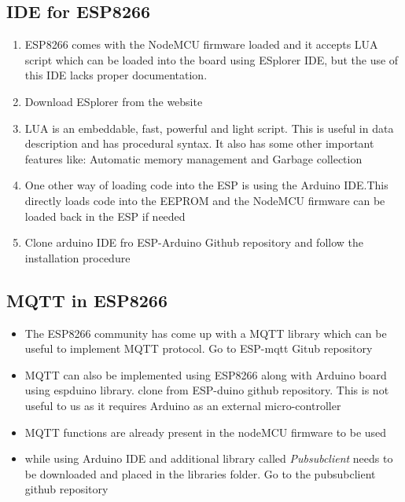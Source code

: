 \documentclass[16pt]{article}
\begin{document}
\vspace{5.5cm}

\subsection{IDE for ESP8266}

\begin{enumerate}

\item
  ESP8266 comes with the NodeMCU firmware loaded and it accepts LUA
  script which can be loaded into the board using ESplorer IDE, but the
  use of this IDE lacks proper documentation.
\item
  Download ESplorer from the website 
\item
  LUA is an embeddable, fast, powerful and light script. This is useful in data
  description and has procedural syntax. It also has some other
  important features like: Automatic memory management and Garbage
  collection
\item
  One other way of loading code into the ESP is using the Arduino
  IDE.This directly loads code into the EEPROM and the NodeMCU firmware
  can be loaded back in the ESP if
  needed
\item Clone
  arduino IDE fro ESP-Arduino Github repository and follow
  the installation procedure
\end{enumerate}

\vspace{0.5cm}

\subsection{MQTT in ESP8266}

\begin{itemize}

\item
  The ESP8266 community has come up with a MQTT library which can be
  useful to implement MQTT protocol. Go to ESP-mqtt Gitub repository
 
\item
  MQTT can also be implemented using ESP8266 along with Arduino board
  using espduino library. clone from ESP-duino github repository. This is not
  useful to us as it requires Arduino as an external micro-controller
\item
  MQTT functions are already present in the nodeMCU firmware to be used
\item
  while using Arduino IDE and additional library called
  \emph{Pubsubclient} needs to be downloaded and placed in the libraries
  folder. Go to the pubsubclient github repository
\end{itemize}
\end{document}

